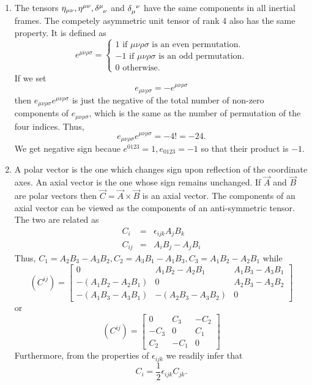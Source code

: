 \begin{enumerate}
\item The tensors $\eta_{\mu\nu}, \eta^{\mu\nu}, \tensor{\delta}{^\mu_\nu}$ and 
$\tensor{\delta}{_\mu^\nu}$ have the same components in all inertial frames. 
The competely asymmetric unit tensor of rank 4 also has the same property. It is
defined as
\begin{equation}\label{c1e52}
e^{\mu\nu\rho\sigma} = \begin{cases}
1 \text{  if  } \mu\nu\rho\sigma \text{  is an even permutation.} \\
-1 \text{  if  } \mu\nu\rho\sigma \text{  is an odd permutation.} \\
0 \text {  otherwise.}
\end{cases}
\end{equation}
If we set
\begin{equation}\label{c1e53}
e_{\mu\nu\rho\sigma} = -e^{\mu\nu\rho\sigma}
\end{equation}
then $e_{\mu\nu\rho\sigma}e^{\mu\nu\rho\sigma}$ is just the negative of the 
total number of non-zero components of $e_{\mu\nu\rho\sigma}$, which is the 
same as the number of permutation of the four indices. Thus,
\begin{equation}\label{c1e54}
e_{\mu\nu\rho\sigma}e^{\mu\nu\rho\sigma} = -4! = -24.
\end{equation}
We get negative sign becaue $e^{0123} = 1, e_{0123} = -1$ so that their product 
is $-1$.

\item A polar vector is the one which changes sign upon reflection of the 
coordinate axes. An axial vector is the one whose sign remains unchanged. If 
$\vec{A}$ and $\vec{B}$ are polar vectors then $\vec{C} = \vec{A} \times 
\vec{B}$ is an axial vector. The components of an axial vector can be viewed 
as the components of an anti-symmetric tensor. The two are related as 
\begin{eqnarray}
C_i &=& \epsilon_{ijk}A_j B_k \label{c1e55} \\
C_{ij} &=& A_i B_j - A_j B_i \label{c1e56}
\end{eqnarray}
Thus, $C_1 = A_2B_3 - A_3B_2, C_2 = A_3B_1 - A_1B_3, C_3 = A_1B_2 - A_2B_1$ 
while
\begin{equation}\label{c1e57}
(C^{ij}) = \begin{bmatrix}0 & A_1B_2 - A_2B_1 & A_1B_3 - A_3B_1 \\
-(A_1B_2 - A_2B_1) & 0 & A_2B_3 - A_3B_2 \\
-(A_1B_3 - A_3B_1) & -(A_2B_3 - A_3B_2) & 0
\end{bmatrix}
\end{equation}
or
\begin{equation}\label{c1e58}
(C^{ij})=\begin{bmatrix}0 & C_3 & -C_2 \\ -C_3 & 0 & C_1 \\ C_2 & -C_1 & 0
\end{bmatrix}
\end{equation}
Furthermore, from the properties of $\epsilon_{ijk}$ we readily infer that
\begin{equation}\label{c1e59}
C_i = \frac{1}{2}\epsilon_{ijk}C_{jk}.
\end{equation}


\end{enumerate}
